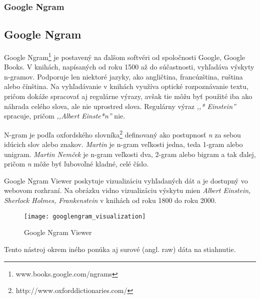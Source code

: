 %
%
{
	\subsubsection{Google Ngram}
}
{
	\subsection{Google Ngram}
}
\label{subsubsec:googlengram}
Google Ngram\footnote{www.books.google.com/ngrams} je postavený na ďalšom softvéri od spoločnosti Google, Google Books. V knihách, napísaných od roku 1500 až do súčastnosti, vyhľadáva výskyty n-gramov. Podporuje len niektoré jazyky, ako angličtina, francúzština, ruština alebo čínština. Na vyhľadávanie v knihách využíva optické rozpoznávanie textu, pričom dokáže spracovať aj regulárne výrazy, avšak tie môžu byť použité iba ako náhrada celého slova, ale nie uprostred slova. Regulárny výraz \textit{,,* Einstein''} spracuje, pričom \textit{,,Albert Einste*n''} nie.

N-gram je podľa oxfordského slovníka\footnote{http://www.oxforddictionaries.com/} definovaný ako postupnosť \textit{n} za sebou idúcich slov alebo znakov. \textit{Martin} je n-gram veľkosti jedna, teda 1-gram alebo unigram. \textit{Martin Nemček} je n-gram veľkosti dva, 2-gram alebo bigram a tak ďalej, pričom \textit{n} môže byť ľubovoľné kladné, celé číslo.

Google Ngram Viewer poskytuje vizualizáciu vyhľadaných dát a je dostupný vo webovom rozhraní. Na obrázku  vidno vizualizáciu výskytu mien \textit{Albert Einstein, Sherlock Holmes, Frankenstein} v knihách od roku 1800 do roku 2000.

\begin{figure}[H]
\begin{center}\texttt{[image: googlengram\_visualization]}\end{center}
\caption[Google Ngram Viewer]{Google Ngram Viewer}\label{fig:googlengram_visualization}
\end{figure}

Tento nástroj okrem iného ponúka aj surové (angl. raw) dáta na stiahnutie.

